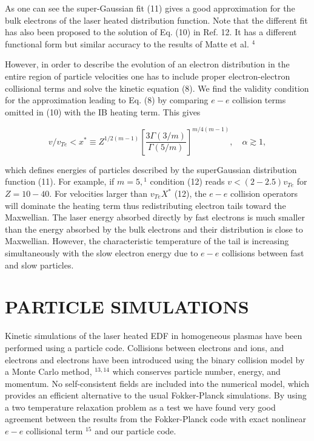 \documentclass[oneside,onecolumn]{article}
\begin{document}
\begin{sloppypar}
 As one can see the super-Gaussian fit (11) gives a good approximation for the bulk electrons of the laser heated distribution function. Note that the different fit has also been proposed to the solution of Eq. (10) in Ref. 12. It has a different functional form but similar accuracy to the results of Matte et al. ${ }^{4}$
 
 However, in order to describe the evolution of an electron distribution in the entire region of particle velocities one has to include proper electron-electron collisional terms and solve the kinetic equation (8). We find the validity condition for the approximation leading to Eq. (8) by comparing $e-e$ collision terms omitted in (10) with the IB heating term. This gives
 
 \begin{dmath}[compact]
 v / v_{T e}<x^{*} \equiv Z^{1 / 2(m-1)}\left[\frac{3 \Gamma(3 / m)}{\Gamma(5 / m)}\right]^{m / 4(m-1)}, \quad \alpha \gtrsim 1,
 \end{dmath}
 
 which defines energies of particles described by the superGaussian distribution function (11). For example, if $m=5,{ }^{1}$ condition (12) reads $v<(2-2.5) v_{T e}$ for $Z=10-40$. For velocities larger than $v_{T e} X^{*}$ (12), the $e-e$ collision operators will dominate the heating term thus redistributing electron tails toward the Maxwellian. The laser energy absorbed directly by fast electrons is much smaller than the energy absorbed by the bulk electrons and their distribution is close to Maxwellian. However, the characteristic temperature of the tail is increasing simultaneously with the slow electron energy due to $e-e$ collisions between fast and slow particles.
 
 \section{PARTICLE SIMULATIONS}
 Kinetic simulations of the laser heated EDF in homogeneous plasmas have been performed using a particle code. Collisions between electrons and ions, and electrons and electrons have been introduced using the binary collision model by a Monte Carlo method, ${ }^{13,14}$ which conserves particle number, energy, and momentum. No self-consistent fields are included into the numerical model, which provides an efficient alternative to the usual Fokker-Planck simulations. By using a two temperature relaxation problem as a test we have found very good agreement between the results from the Fokker-Planck code with exact nonlinear $e-e$ collisional term ${ }^{15}$ and our particle code.
 

\end{sloppypar}
\end{document}
